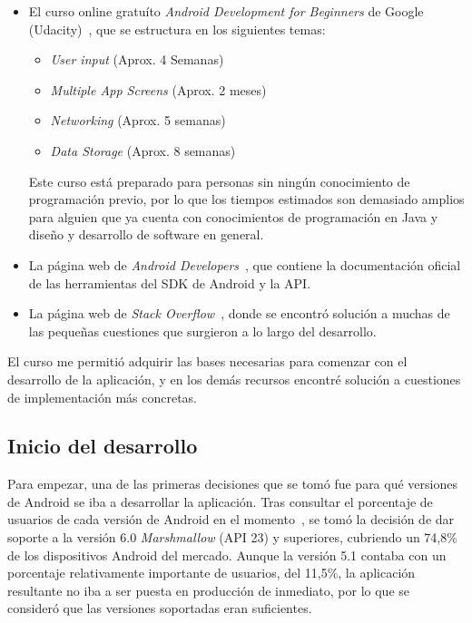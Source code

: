 \begin{itemize}
	\item El curso online gratuíto \textit{Android Development for Beginners} de Google (Udacity)~\cite{udacity}, que se estructura en los siguientes temas: 
	
	\begin{minipage}{\linewidth}
	\begin{itemize}
		\item \textit{User input} (Aprox. 4 Semanas)
		\item \textit{Multiple App Screens} (Aprox. 2 meses)
		\item \textit{Networking} (Aprox. 5 semanas)
		\item \textit{Data Storage} (Aprox. 8 semanas)
	\end{itemize}
	\end{minipage}
	
	Este curso está preparado para personas sin ningún conocimiento de programación previo, por lo que los tiempos estimados son demasiado amplios para alguien que ya cuenta con conocimientos de programación en Java y diseño y desarrollo de software en general. 
	\item La página web de \textit{Android Developers}~\cite{androiddevelopers}, que contiene la documentación oficial de las herramientas del SDK de Android y la API. 
	\item La página web de \textit{Stack Overflow}~\cite{stackoverflow}, donde se encontró solución a muchas de las pequeñas cuestiones que surgieron a lo largo del desarrollo. 
\end{itemize}

El curso me permitió adquirir las bases necesarias para comenzar con el desarrollo de la aplicación, y en los demás recursos encontré solución a cuestiones de implementación más concretas. 

\subsection{Inicio del desarrollo}

Para empezar, una de las primeras decisiones que se tomó fue para qué versiones de Android se iba a desarrollar la aplicación. Tras consultar el porcentaje de usuarios de cada versión de Android en el momento~\cite{paneldecontrol}, se tomó la decisión de dar soporte a la versión 6.0 \textit{Marshmallow} (API 23) y superiores, cubriendo un 74,8\% de los dispositivos Android del mercado. Aunque la versión 5.1 contaba con un porcentaje relativamente importante de usuarios, del 11,5\%, la aplicación resultante no iba a ser puesta en producción de inmediato, por lo que se consideró que las versiones soportadas eran suficientes. 

